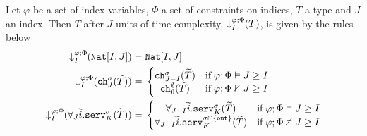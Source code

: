 \begin{defi}\label{def:delaysized}
Let $\varphi$ be a set of index variables, $\Phi$ a set of constraints on indices, $T$ a type and $J$ an index. Then $T$ after $J$ units of time complexity, $\susume{T}{\varphi}{\Phi}{I}$, is given by the rules below
\begin{align*}
    \susume{\natinterval{I}{J}}{\varphi}{\Phi}{I} =&\; \natinterval{I}{J}\\
    \susume{\texttt{ch}^\sigma_J(\widetilde{T})}{\varphi}{\Phi}{I} =&\; \left\{ \begin{matrix}
        \texttt{ch}^\sigma_{J-I}(\widetilde{T}) & \text{if}\; \varphi;\Phi \vDash J \geq I\\
        \texttt{ch}^\emptyset_{0}(\widetilde{T}) & \text{if}\; \varphi;\Phi \nvDash J \geq I
    \end{matrix} \right.\\
    \susume{\forall_J\widetilde{i}.\texttt{serv}^\sigma_K(\widetilde{T})}{\varphi}{\Phi}{I} =&\; \left\{ \begin{matrix}
        \forall_{J-I}\widetilde{i}.\texttt{serv}^\sigma_K(\widetilde{T}) & \text{if}\; \varphi;\Phi \vDash J \geq I\\
        \forall_{J-I}\widetilde{i}.\texttt{serv}^{\sigma \cap \{\texttt{out}\}}_K(\widetilde{T}) & \text{if}\; \varphi;\Phi \nvDash J \geq I
    \end{matrix} \right.
\end{align*}
\end{defi}

